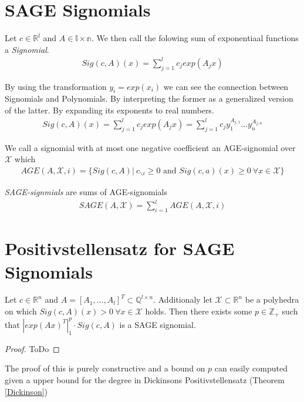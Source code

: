 \documentclass[./main.tex]{subfiles}
\begin{document}
\section{SAGE Signomials}
\begin{ddef}[Signomial]
Let $c \in \mathbb{R}^l$ and $A \in \mathbb{l\times n}$. We then call the folowing sum of exponentiaal functions a \emph{Signomial}.
\begin{align*}
Sig(c,A)(x) = \sum_{j=1}^l c_j exp(A_jx)
\end{align*}
\end{ddef}
By using the transformation $y_i=exp(x_i)$ we can see the connection between Signomials and Polynomials. By interpreting the former as a generalized version of the latter. By expanding its exponents to real numbers.
\begin{align*}
Sig(c,A)(x) = \sum_{j=1}^l c_j exp(A_jx) = \sum_{j=1}^l c_j y_1^{A_{j,1}} \dots y_n^{A_{j,n}}
\end{align*}
\begin{ddef}
We call a signomial with at most one negative coefficient an AGE-signomial over $\mathcal{X}$  which 
\begin{align*}
AGE(A,\mathcal{X}, i) = \lbrace Sig(c,A) | \ c_{\backslash i} \geq 0 \text{ and } Sig(c,a)(x) \geq 0 \ \forall x \in \mathcal{X} \rbrace
\end{align*}
\end{ddef}
\begin{ddef}
\emph{SAGE-signmials} are sums of AGE-signomials
\begin{align*}
SAGE(A,\mathcal{X}) = \sum_{i=1}^l AGE(A,\mathcal{X},i)
\end{align*}

\end{ddef}
\section{Positivstellensatz for SAGE Signomials}

\begin{thm} Let $c \in \mathbb{R}^n$ and $A = \left[A_1,\dots, A_l \right]^T \subset \mathbb{Q}^{l\times n}$. Additionaly let $\mathcal{X} \subset \mathbb{R}^n$ be a polyhedra on which $Sig(c,A)(x) > 0 \ \forall x \in \mathcal{X}$ holds. Then there exists some $p \in \mathbb{Z}_+$ such that $|exp(Ax)^T|^p_1 \cdot Sig(c,A)$ is a SAGE signomial.
\begin{proof}
ToDo
\end{proof}
\end{thm}
The proof of this is purely constructive and a bound on $p$ can easily computed given a upper bound for the degree in Dickinsons Positivstellensatz (Theorem \ref{Dickinson})
\end{document}

